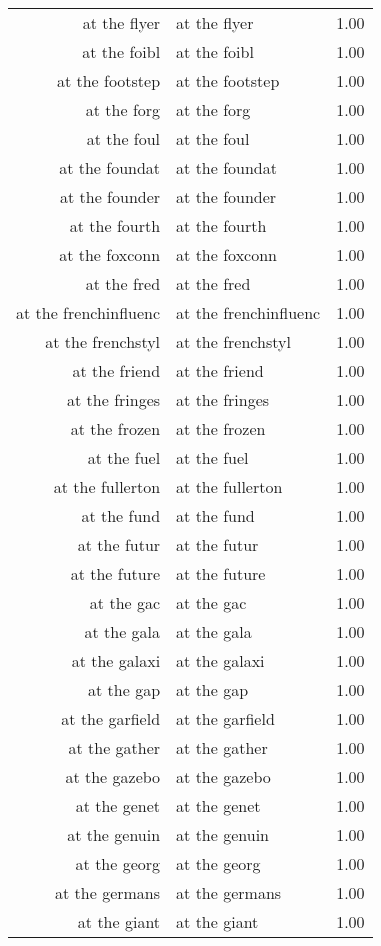 \begin{table}[ht]
\begin{tabular}{rlr}
  at the flyer & at the flyer & 1.00 \\ 
  at the foibl & at the foibl & 1.00 \\ 
  at the footstep & at the footstep & 1.00 \\ 
  at the forg & at the forg & 1.00 \\ 
  at the foul & at the foul & 1.00 \\ 
  at the foundat & at the foundat & 1.00 \\ 
  at the founder & at the founder & 1.00 \\ 
  at the fourth & at the fourth & 1.00 \\ 
  at the foxconn & at the foxconn & 1.00 \\ 
  at the fred & at the fred & 1.00 \\ 
  at the frenchinfluenc & at the frenchinfluenc & 1.00 \\ 
  at the frenchstyl & at the frenchstyl & 1.00 \\ 
  at the friend & at the friend & 1.00 \\ 
  at the fringes & at the fringes & 1.00 \\ 
  at the frozen & at the frozen & 1.00 \\ 
  at the fuel & at the fuel & 1.00 \\ 
  at the fullerton & at the fullerton & 1.00 \\ 
  at the fund & at the fund & 1.00 \\ 
  at the futur & at the futur & 1.00 \\ 
  at the future & at the future & 1.00 \\ 
  at the gac & at the gac & 1.00 \\ 
  at the gala & at the gala & 1.00 \\ 
  at the galaxi & at the galaxi & 1.00 \\ 
  at the gap & at the gap & 1.00 \\ 
  at the garfield & at the garfield & 1.00 \\ 
  at the gather & at the gather & 1.00 \\ 
  at the gazebo & at the gazebo & 1.00 \\ 
  at the genet & at the genet & 1.00 \\ 
  at the genuin & at the genuin & 1.00 \\ 
  at the georg & at the georg & 1.00 \\ 
  at the germans & at the germans & 1.00 \\ 
  at the giant & at the giant & 1.00 \\ 

\end{tabular}
\end{table}
